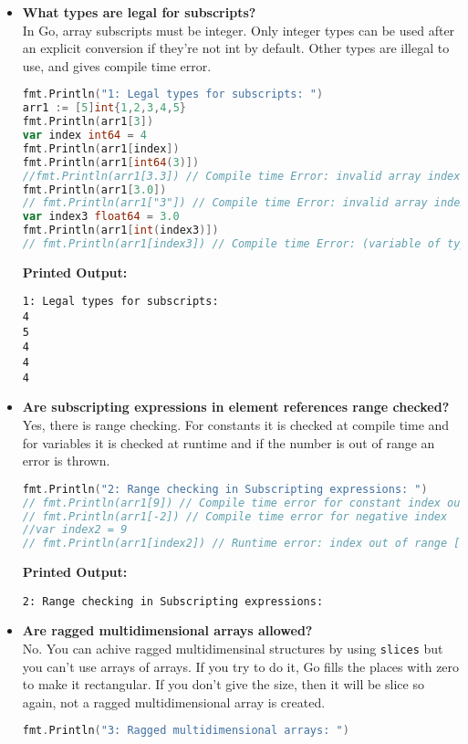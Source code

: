 \documentclass{article}
\begin{document}
\begin{itemize}
\item \textbf{What types are legal for subscripts?} \\
 In Go, array subscripts must be integer. Only integer types can be used after an explicit conversion if they’re not int by default. Other types are illegal to use, and gives compile time error. 
\begin{lstlisting}[language=Go]
fmt.Println("1: Legal types for subscripts: ")
arr1 := [5]int{1,2,3,4,5}
fmt.Println(arr1[3])
var index int64 = 4
fmt.Println(arr1[index])
fmt.Println(arr1[int64(3)]) 
//fmt.Println(arr1[3.3]) // Compile time Error: invalid array index 3.3 (type float64)
fmt.Println(arr1[3.0])
// fmt.Println(arr1["3"]) // Compile time Error: invalid array index "3" (type string)
var index3 float64 = 3.0
fmt.Println(arr1[int(index3)])
// fmt.Println(arr1[index3]) // Compile time Error: (variable of type float64) must be integer
\end{lstlisting}
\textbf{Printed Output:}
\begin{verbatim}
1: Legal types for subscripts: 
4
5
4
4
4
\end{verbatim}


\item \textbf{Are subscripting expressions in element references range checked?} \\	
Yes, there is range checking. For constants it is checked at compile time and for variables it is checked at runtime and if the number is out of range an error is thrown. 
\begin{lstlisting}[language=Go]
fmt.Println("2: Range checking in Subscripting expressions: ")
// fmt.Println(arr1[9]) // Compile time error for constant index out of range
// fmt.Println(arr1[-2]) // Compile time error for negative index
//var index2 = 9
// fmt.Println(arr1[index2]) // Runtime error: index out of range [9] with length 5
\end{lstlisting}
\textbf{Printed Output:}
\begin{verbatim}
2: Range checking in Subscripting expressions: 
\end{verbatim}


\item \textbf{Are ragged multidimensional arrays allowed?} \\
No. You can achive ragged multidimensinal structures by using \texttt{slices} but you can't use arrays of arrays. If you try to do it, Go fills the places with zero to make it rectangular. If you don't give the size, then it will be slice so again, not a ragged multidimensional array is created.
\begin{lstlisting}[language=GO]
fmt.Println("3: Ragged multidimensional arrays: ")


\end{lstlisting}
\end{itemize}
\end{document}
